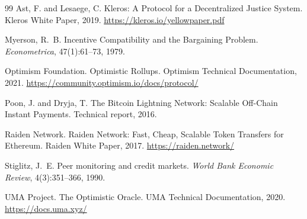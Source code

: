 \documentclass[11pt,a4paper]{article}
\theoremstyle{definition}
\theoremstyle{remark}
\begin{document}
\begin{thebibliography}{99}
Ast, F. and Lesaege, C.
\newblock Kleros: A Protocol for a Decentralized Justice System.
\newblock Kleros White Paper, 2019.
\newblock \url{https://kleros.io/yellowpaper.pdf}

Myerson, R.~B.
\newblock Incentive Compatibility and the Bargaining Problem.
\newblock \emph{Econometrica}, 47(1):61--73, 1979.

Optimism Foundation.
\newblock Optimistic Rollups.
\newblock Optimism Technical Documentation, 2021.
\newblock \url{https://community.optimism.io/docs/protocol/}

Poon, J. and Dryja, T.
\newblock The Bitcoin Lightning Network: Scalable Off-Chain Instant Payments.
\newblock Technical report, 2016.

Raiden Network.
\newblock Raiden Network: Fast, Cheap, Scalable Token Transfers for Ethereum.
\newblock Raiden White Paper, 2017.
\newblock \url{https://raiden.network/}

Stiglitz, J.~E.
\newblock Peer monitoring and credit markets.
\newblock \emph{World Bank Economic Review}, 4(3):351--366, 1990.

UMA Project.
\newblock The Optimistic Oracle.
\newblock UMA Technical Documentation, 2020.
\newblock \url{https://docs.uma.xyz/}

\end{thebibliography}
\end{document}
